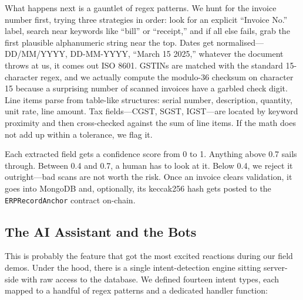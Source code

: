 \documentclass[conference]{IEEEtran}
\begin{document}
What happens next is a gauntlet of regex patterns. We hunt for the invoice number first, trying three strategies in order: look for an explicit ``Invoice No.'' label, search near keywords like ``bill'' or ``receipt,'' and if all else fails, grab the first plausible alphanumeric string near the top. Dates get normalised---DD/MM/YYYY, DD-MM-YYYY, ``March 15 2025,'' whatever the document throws at us, it comes out ISO 8601. GSTINs are matched with the standard 15-character regex, and we actually compute the modulo-36 checksum on character 15 because a surprising number of scanned invoices have a garbled check digit. Line items parse from table-like structures: serial number, description, quantity, unit rate, line amount. Tax fields---CGST, SGST, IGST---are located by keyword proximity and then cross-checked against the sum of line items. If the math does not add up within a tolerance, we flag it.

Each extracted field gets a confidence score from 0 to 1. Anything above 0.7 sails through. Between 0.4 and 0.7, a human has to look at it. Below 0.4, we reject it outright---bad scans are not worth the risk. Once an invoice clears validation, it goes into MongoDB and, optionally, its keccak256 hash gets posted to the \texttt{ERPRecordAnchor} contract on-chain.

\subsection{The AI Assistant and the Bots}
This is probably the feature that got the most excited reactions during our field demos. Under the hood, there is a single intent-detection engine sitting server-side with raw access to the database. We defined fourteen intent types, each mapped to a handful of regex patterns and a dedicated handler function:
\end{document}
